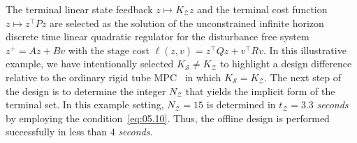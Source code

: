 \documentclass[twocolumn]{autart}
\newcommand{\mc}[1]{\mathcal{#1}}
\numberwithin{equation}{section}
\begin{document}
The terminal linear state feedback $z\mapsto K_\mc{Z}z$ and the terminal cost function $z\mapsto z^\top Pz$ are selected as the solution of the unconstrained infinite horizon discrete time linear quadratic regulator for the disturbance free system $z^+=Az+Bv$ with the stage cost $\ell(z,v)=z^\top Q z+v^\top R v$. In this illustrative example, we have intentionally selected $K_\mc{S}\neq K_\mc{Z}$ to highlight a design difference relative to the ordinary rigid tube MPC~\cite{mayne:seron:rakovic:2005} in which $K_\mc{S}=K_\mc{Z}$. The next step of the design is to determine the integer $N_\mc{Z}$ that yields the implicit form of the terminal set. In this example setting, $N_\mc{Z}=15$ is determined in $t_\mc{Z}=3.3$ \emph{seconds} by employing the condition~\eqref{eq:05.10}. Thus, the offline design is performed successfully in less than $4$ \emph{seconds}. 
\end{document}

